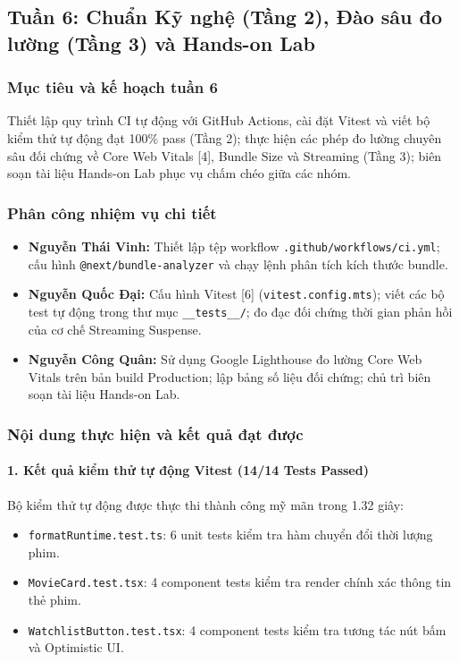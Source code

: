 \documentclass[13pt,a4paper]{extarticle}
\begin{document}
\subsection{Tuần 6: Chuẩn Kỹ nghệ (Tầng 2), Đào sâu đo lường (Tầng 3) và Hands-on Lab}

\subsubsection{Mục tiêu và kế hoạch tuần 6}
Thiết lập quy trình CI tự động với GitHub Actions, cài đặt Vitest và viết bộ kiểm thử tự động đạt 100\% pass (Tầng 2); thực hiện các phép đo lường chuyên sâu đối chứng về Core Web Vitals [4], Bundle Size và Streaming (Tầng 3); biên soạn tài liệu Hands-on Lab phục vụ chấm chéo giữa các nhóm.

\subsubsection{Phân công nhiệm vụ chi tiết}
\begin{itemize}[noitemsep]
    \item \textbf{Nguyễn Thái Vinh:} Thiết lập tệp workflow \texttt{.github/workflows/ci.yml}; cấu hình \texttt{@next/bundle-analyzer} và chạy lệnh phân tích kích thước bundle.
    \item \textbf{Nguyễn Quốc Đại:} Cấu hình Vitest [6] (\texttt{vitest.config.mts}); viết các bộ test tự động trong thư mục \texttt{\_\_tests\_\_/}; đo đạc đối chứng thời gian phản hồi của cơ chế Streaming Suspense.
    \item \textbf{Nguyễn Công Quân:} Sử dụng Google Lighthouse đo lường Core Web Vitals trên bản build Production; lập bảng số liệu đối chứng; chủ trì biên soạn tài liệu Hands-on Lab.
\end{itemize}

\subsubsection{Nội dung thực hiện và kết quả đạt được}
\paragraph{1. Kết quả kiểm thử tự động Vitest (14/14 Tests Passed)}
Bộ kiểm thử tự động được thực thi thành công mỹ mãn trong 1.32 giây:
\begin{itemize}[noitemsep]
    \item \texttt{formatRuntime.test.ts}: 6 unit tests kiểm tra hàm chuyển đổi thời lượng phim.
    \item \texttt{MovieCard.test.tsx}: 4 component tests kiểm tra render chính xác thông tin thẻ phim.
    \item \texttt{WatchlistButton.test.tsx}: 4 component tests kiểm tra tương tác nút bấm và Optimistic UI.
\end{itemize}
\end{document}
